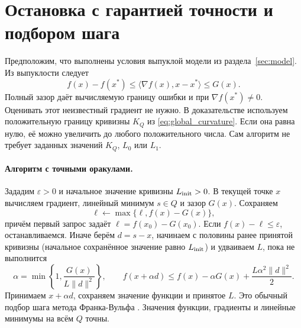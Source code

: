 \section{Остановка с гарантией точности и подбором шага}
\label{sec:stopping}
Предположим, что выполнены условия выпуклой модели из
раздела~\ref{sec:model}. Из выпуклости следует
\begin{equation}\label{eq:gap_certificate}
 f(x)-f(x^*)\le
 \langle\nabla f(x),x-x^*\rangle\le G(x).
\end{equation}
Полный зазор даёт вычисляемую границу ошибки и при
$\nabla f(x^*)\ne0$. Оценивать этот неизвестный градиент не нужно.
В доказательстве используем положительную границу кривизны $K_Q$
из \eqref{eq:global_curvature}. Если она равна нулю, её можно
увеличить до любого положительного числа. Сам алгоритм не требует
заданных значений $K_Q$, $L_0$ или $L_1$.

\paragraph{Алгоритм с точными оракулами.}
Зададим $\varepsilon>0$ и начальное значение кривизны
$L_{\rm init}>0$. В текущей точке $x$ вычисляем градиент,
линейный минимум $s\in Q$ и зазор $G(x)$. Сохраняем
\[
 \ell\leftarrow\max\{\ell,f(x)-G(x)\},
\]
причём первый запрос задаёт $\ell=f(x_0)-G(x_0)$.
Если $f(x)-\ell\le\varepsilon$, останавливаемся.
Иначе берём $d=s-x$, начинаем с половины ранее принятой кривизны
(начальное сохранённое значение равно $L_{\rm init}$) и удваиваем
$L$, пока не выполнится
\begin{equation}\label{eq:stopping_bt}
 \alpha=\min\left\{1,\frac{G(x)}{L\|d\|^2}\right\},\qquad
 f(x+\alpha d)\le f(x)-\alpha G(x)+\frac{L\alpha^2\|d\|^2}{2}.
\end{equation}
Принимаем $x+\alpha d$, сохраняем значение функции и принятое $L$.
Это обычный подбор шага метода Франка-Вульфа \cite{pedregosa}.
Значения функции, градиенты и линейные минимумы на всём $Q$ точны.

